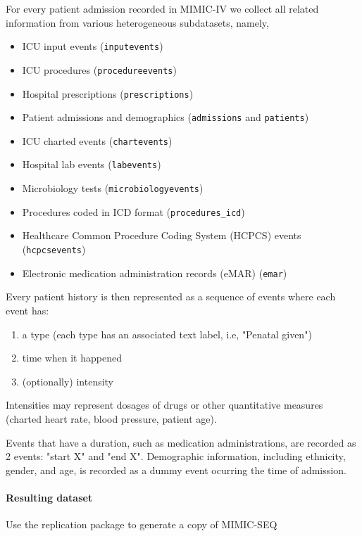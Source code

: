 For every patient admission recorded in MIMIC-IV we collect all related information from various heterogeneous subdatasets, namely,

\begin{itemize}
    \item ICU input events (\texttt{inputevents})
    \item ICU procedures (\texttt{procedureevents})
    \item Hospital prescriptions (\texttt{prescriptions})
    \item Patient admissions and demographics (\texttt{admissions} and \texttt{patients})
    \item ICU charted events (\texttt{chartevents})
    \item Hospital lab events (\texttt{labevents})
    \item Microbiology tests (\texttt{microbiologyevents})
    \item Procedures coded in ICD format (\texttt{procedures\_icd})
    \item Healthcare Common Procedure Coding System (HCPCS) events (\texttt{hcpcsevents})
    \item Electronic medication administration records (eMAR) (\texttt{emar})
\end{itemize}

Every patient history is then represented as a sequence of events where each event has:
\begin{enumerate}
    \item a type (each type has an associated text label, i.e, "Penatal given")
    \item time when it happened
    \item (optionally) intensity
\end{enumerate}

Intensities may represent dosages of drugs or other quantitative measures (charted heart rate, blood pressure, patient age).

Events that have a duration, such as medication administrations, are recorded as 2 events: "start X" and "end X". 
Demographic information, including ethnicity, gender, and age, is recorded as a dummy event ocurring the time of admission.

\paragraph{Resulting dataset}

\begin{remark}
    Use the replication package \cite{liventsevVadim0x60Mimicseq2024} to generate a copy of MIMIC-SEQ
\end{remark}

